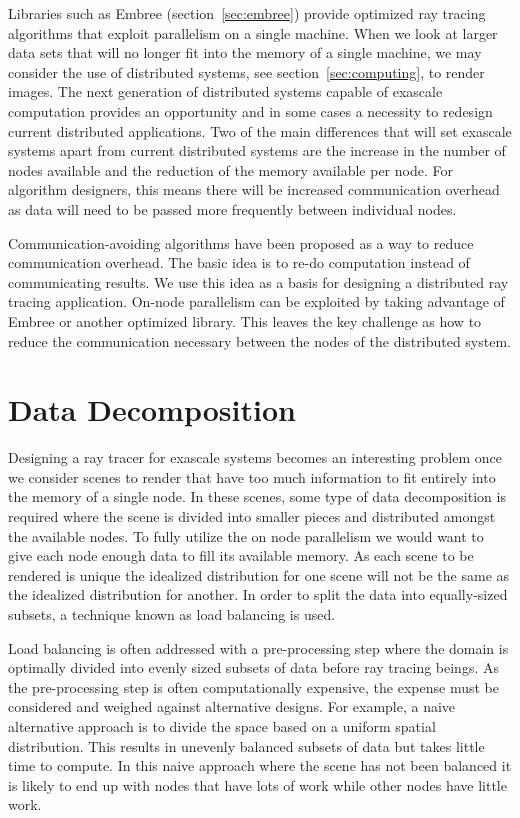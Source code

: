 \label{sec:design}

Libraries such as Embree (section~\ref{sec:embree}) provide optimized ray 
tracing algorithms that exploit parallelism on a single machine.  When we look
at larger data sets that will no longer fit into the memory of a single machine,
we may consider the use of distributed systems, see section~\ref{sec:computing},
to render images.  The next generation of distributed systems capable of 
exascale computation provides an opportunity and in some cases a necessity to 
redesign current distributed applications.  Two of the main differences that 
will set exascale systems apart from current distributed systems are the 
increase in the number of nodes available and the reduction of the memory 
available per node.  For algorithm designers, this means there will be increased
communication overhead as data will need to be passed more frequently between 
individual nodes.

Communication-avoiding algorithms have been proposed as a way to reduce 
communication overhead.  The basic idea is to re-do computation instead of 
communicating results.  We use this idea as a basis for designing a distributed 
ray tracing application.  On-node parallelism can be exploited by taking 
advantage of Embree or another optimized library.  This leaves the key challenge 
as how to reduce the communication necessary between the nodes of the 
distributed system.

\section{Data Decomposition}
\label{sec:data_decomposition}
Designing a ray tracer for exascale systems becomes an interesting problem once
we consider scenes to render that have too much information to fit entirely into
the memory of a single node.  In these scenes, some type of data decomposition 
is required where the scene is divided into smaller pieces and distributed 
amongst the available nodes. To fully utilize the on node parallelism we would 
want to give each node enough data to fill its available memory. As each scene 
to be rendered is unique the idealized distribution for one scene will not be 
the same as the idealized distribution for another.  In order to split the data
into equally-sized subsets, a technique known as load balancing is used.

Load balancing is often addressed with a pre-processing step where the domain is 
optimally divided into evenly sized subsets of data before ray tracing beings. 
As the pre-processing step is often computationally expensive, the expense must 
be considered and weighed against alternative designs. For example, a naive 
alternative approach is to divide the space based on a uniform spatial 
distribution.  This results in unevenly balanced subsets of data but takes 
little time to compute.  In this naive approach where the scene has not been 
balanced it is likely to end up with nodes that have lots of work while other 
nodes have little work.

